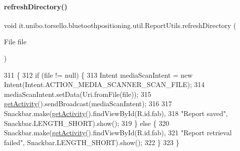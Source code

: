 \paragraph{\texorpdfstring{refresh\+Directory()}{refreshDirectory()}}
{\footnotesize\ttfamily void it.\+unibo.\+torsello.\+bluetoothpositioning.\+util.\+Report\+Utils.\+refresh\+Directory (\begin{DoxyParamCaption}\item[{File}]{file }\end{DoxyParamCaption})\hspace{0.3cm}{\ttfamily [private]}}


\begin{DoxyCode}
311                                              \{
312         \textcolor{keywordflow}{if} (file != null) \{
313             Intent mediaScanIntent = \textcolor{keyword}{new} Intent(Intent.ACTION\_MEDIA\_SCANNER\_SCAN\_FILE);
314             mediaScanIntent.setData(Uri.fromFile(file));
315             \hyperlink{classit_1_1unibo_1_1torsello_1_1bluetoothpositioning_1_1util_1_1ReportUtils_a397da2904c606315301d19eb39451181_a397da2904c606315301d19eb39451181}{getActivity}().sendBroadcast(mediaScanIntent);
316 
317             Snackbar.make(\hyperlink{classit_1_1unibo_1_1torsello_1_1bluetoothpositioning_1_1util_1_1ReportUtils_a397da2904c606315301d19eb39451181_a397da2904c606315301d19eb39451181}{getActivity}().findViewById(R.id.fab),
318                     \textcolor{stringliteral}{"Report saved"}, Snackbar.LENGTH\_SHORT).show();
319         \} \textcolor{keywordflow}{else} \{
320             Snackbar.make(\hyperlink{classit_1_1unibo_1_1torsello_1_1bluetoothpositioning_1_1util_1_1ReportUtils_a397da2904c606315301d19eb39451181_a397da2904c606315301d19eb39451181}{getActivity}().findViewById(R.id.fab),
321                     \textcolor{stringliteral}{"Report retrieval failed"}, Snackbar.LENGTH\_SHORT).show();
322         \}
323     \}
\end{DoxyCode}
\hypertarget{classit_1_1unibo_1_1torsello_1_1bluetoothpositioning_1_1util_1_1ReportUtils_ae68aaee9a1033dd6659cc3d6af970f60_ae68aaee9a1033dd6659cc3d6af970f60}{}\label{classit_1_1unibo_1_1torsello_1_1bluetoothpositioning_1_1util_1_1ReportUtils_ae68aaee9a1033dd6659cc3d6af970f60_ae68aaee9a1033dd6659cc3d6af970f60} 
